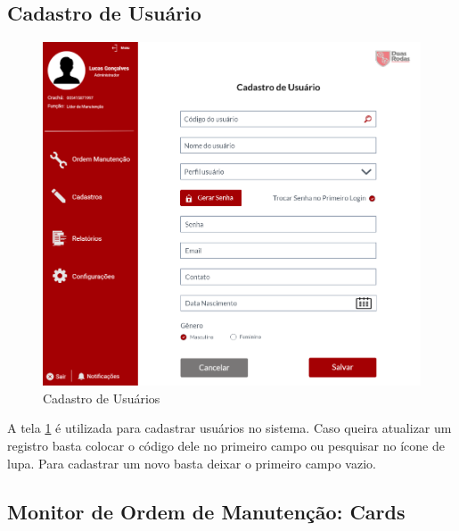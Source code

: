 \subsection{Cadastro de Usuário}

\begin{figure}[H]
	\caption{\label{web_cad-user}Cadastro de Usuários}
	\begin{center}
		\includegraphics[scale=0.70]{./Figuras/web/cad-user.png}
	\end{center}
\end{figure}

A tela \ref{web_cad-user} é utilizada para cadastrar usuários no sistema. Caso queira atualizar um registro basta colocar o código dele no primeiro campo ou pesquisar no ícone de lupa. Para cadastrar um novo basta deixar o primeiro campo vazio.

\subsection{Monitor de Ordem de Manutenção: Cards}

